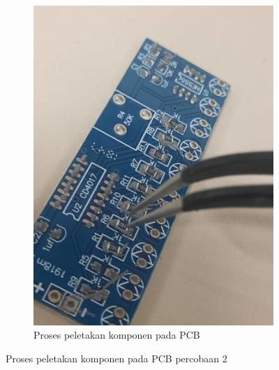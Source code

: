 \begin{figure}[H]
\begin{subfigure}[b]{0.4\linewidth}
    \includegraphics[width=\linewidth]{img/modul_2/percobaan2_awal.jpg}
    \caption{Proses peletakan komponen pada PCB\label{fig:inisub2}}
  \end{subfigure}
  \caption{Proses peletakan komponen pada PCB percobaan 2\label{fig:keduagambar}}
\end{figure}

